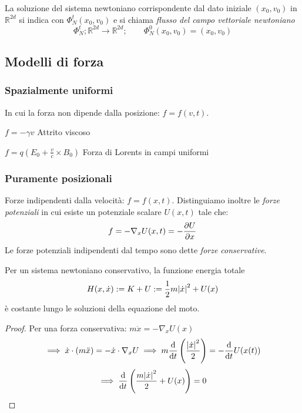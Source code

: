 \begin{definition}
    La soluzione del sistema newtoniano corrispondente dal dato iniziale $(x_0, v_0)$ in $\mathbb{R}^{2d}$ si indica con 
    $\Phi_N^t(x_0,v_0)$ e si chiama \textit{flusso del campo vettoriale newtoniano}
    \begin{equation}
        \Phi_N^t; \mathbb{R}^{2d}\rightarrow\mathbb{R}^{2d} ; \qquad \Phi_N^0 (x_0,v_0)= (x_0,v_0) 
    \end{equation}
\end{definition}


\subsection{Modelli di forza}
\subsubsection{Spazialmente uniformi}
In cui la forza non dipende dalla posizione: $f = f(v,t)$.
\begin{example}
    $f = -\gamma v $ Attrito viscoso
\end{example}
\begin{example}
    $f = q(E_0+ \frac{v}{c}\times B_0)$ Forza di Lorents in campi uniformi
\end{example}
\subsubsection{Puramente posizionali}
Forze indipendenti dalla velocità: $f= f(x,t)$. Distinguiamo inoltre le \textit{forze potenziali} in cui esiste un potenziale scalare $U(x,t)$
tale che:
\begin{equation}
    f= -\nabla_xU(x,t)= -\pdv{U}{x}(x,t)
\end{equation}
Le forze potenziali indipendenti dal tempo sono dette \textit{forze conservative}.
\begin{theorem}
    Per un sistema newtoniano conservativo, la funzione energia totale
    \begin{equation}
        H(x,\dot{x}):= K +U := \frac{1}{2}m\abs{\dot{x}}^2+U(x)
    \end{equation}
    è costante lungo le soluzioni della equazione del moto.
\end{theorem}
\begin{proof}
    Per una forza conservativa: $m\ddot{x}= -\nabla_xU(x)$
    \begin{equation*}
        \implies \dot{x}\cdot (m\ddot{x})= -\dot{x} \cdot\nabla_xU \implies m\dv{}{t}\left( \frac{\abs{\dot{x}}^2}{2} \right)= -\dv{}{t}U(x(t))
    \end{equation*}
    \begin{equation}
        \implies \dv{}{t}\left( \frac{m\abs{\dot{x}}^2}{2} +U(x) \right) = 0
    \end{equation}
\end{proof}

